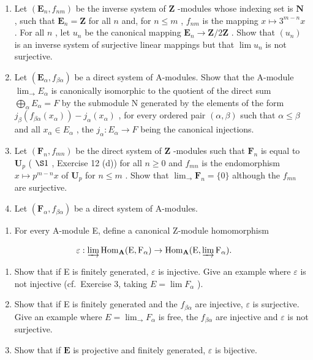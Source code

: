 \BourbakiExercisesSection

\begin{enumerate}
\def\labelenumi{\arabic{enumi}.}
\item
  Let \((\mathbf{E}_n, f_{nm})\) be the inverse system of \(\mathbf{Z}\) -modules whose indexing set is \(\mathbf{N}\) , such that \(\mathbf{E}_n = \mathbf{Z}\) for all \(n\) and, for \(n \leqslant m\) , \(f_{nm}\) is the mapping \(x \mapsto 3^{m - n}x\) . For all \(n\) , let \(u_n\) be the canonical mapping \(\mathbf{E}_n \to \mathbf{Z}/2\mathbf{Z}\) . Show that \((u_n)\) is an inverse system of surjective linear mappings but that \(\lim u_n\) is not surjective.
\item
  Let \((\mathbf{E}_{\alpha}, f_{\beta\alpha})\) be a direct system of A-modules. Show that the A-module \(\lim_{\rightarrow} E_{\alpha}\) is canonically isomorphic to the quotient of the direct sum \(\bigoplus_{\alpha} E_{\alpha} = F\) by the submodule N generated by the elements of the form \(j_{\beta}(f_{\beta\alpha}(x_{\alpha})) - j_{\alpha}(x_{\alpha})\) , for every ordered pair \((\alpha, \beta)\) such that \(\alpha \leqslant \beta\) and all \(x_{\alpha} \in E_{\alpha}\) , the \(j_{\alpha}: E_{\alpha} \to F\) being the canonical injections.
\item
  Let \((\mathbf{F}_n, f_{mn})\) be the direct system of \(\mathbf{Z}\) -modules such that \(\mathbf{F}_n\) is equal to \(\mathbf{U}_p\) ( \(\S 1\) , Exercise 12 (d)) for all \(n \geqslant 0\) and \(f_{mn}\) is the endomorphism \(x \mapsto p^{m-n}x\) of \(\mathbf{U}_p\) for \(n \leqslant m\) . Show that \(\lim_{\longrightarrow} \mathbf{F}_n = \{0\}\) although the \(f_{mn}\) are surjective.
\item
  Let \((\mathbf{F}_{\alpha}, f_{\beta \alpha})\) be a direct system of A-modules.
\end{enumerate}

\begin{enumerate}
\def\labelenumi{(\alph{enumi})}
\tightlist
\item
  For every A-module E, define a canonical Z-module homomorphism
\end{enumerate}

\[
\varepsilon : \varinjlim \operatorname{Hom} _ {\mathbf {A}} (\mathrm{E}, \mathrm{F} _ {\alpha}) \rightarrow \operatorname{Hom} _ {\mathbf {A}} (\mathrm{E}, \varinjlim \mathrm{F} _ {\alpha}).
\]

\begin{enumerate}
\def\labelenumi{(\alph{enumi})}
\setcounter{enumi}{1}
\item
  Show that if E is finitely generated, \(\varepsilon\) is injective. Give an example where \(\varepsilon\) is not injective (cf.~Exercise 3, taking \(E = \lim F_{\alpha}\) ).
\item
  Show that if E is finitely generated and the \(f_{\beta\alpha}\) are injective, \(\varepsilon\) is surjective. Give an example where \(E = \lim_{\longrightarrow} F_{\alpha}\) is free, the \(f_{\beta\alpha}\) are injective and \(\varepsilon\) is not surjective.
\item
  Show that if \(\mathbf{E}\) is projective and finitely generated, \(\varepsilon\) is bijective.
\end{enumerate}

